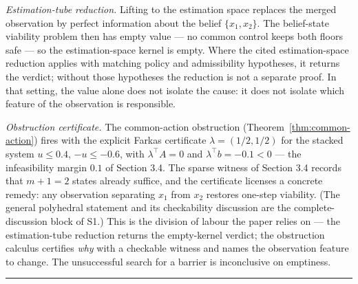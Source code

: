 \documentclass[11pt]{article}
\theoremstyle{definition}
\begin{document}
\emph{Estimation-tube reduction.} Lifting to the estimation space replaces the merged observation by perfect information about the belief \(\{x_1,x_2\}\). The belief-state viability problem then has empty value --- no common control keeps both floors safe --- so the estimation-space kernel is empty. Where the cited estimation-space reduction applies with matching policy and admissibility hypotheses, it returns the verdict; without those hypotheses the reduction is not a separate proof. In that setting, the value alone does not isolate the cause: it does not isolate which feature of the observation is responsible.

\emph{Obstruction certificate.} The common-action obstruction (Theorem~\ref{thm:common-action}) fires with the explicit Farkas certificate \(\lambda=(1/2,1/2)\) for the stacked system \(u\le 0.4\), \(-u\le -0.6\), with \(\lambda^{\top}A=0\) and \(\lambda^{\top}b=-0.1<0\) --- the infeasibility margin \(0.1\) of Section 3.4. The sparse witness of Section 3.4 records that \(m+1=2\) states already suffice, and the certificate licenses a concrete remedy: any observation separating \(x_1\) from \(x_2\) restores one-step viability. (The general polyhedral statement and its checkability discussion are the complete-discussion block of S1.) This is the division of labour the paper relies on --- the estimation-tube reduction returns the empty-kernel verdict; the obstruction calculus certifies \emph{why} with a checkable witness and names the observation feature to change. The unsuccessful search for a barrier is inconclusive on emptiness.


\begin{center}\rule{0.5\linewidth}{0.5pt}\end{center}
\end{document}
